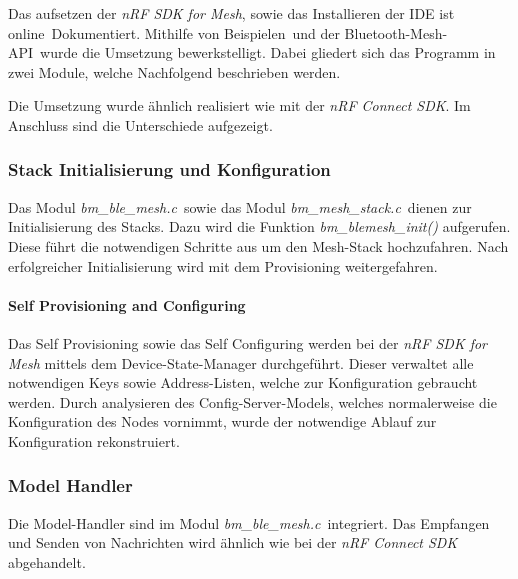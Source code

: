 Das aufsetzen der \textit{nRF SDK for Mesh}, sowie das Installieren der IDE ist online\footnotemark\ Dokumentiert. Mithilfe von Beispielen\footnotemark\ und der Bluetooth-Mesh-API\footnotemark\ wurde die Umsetzung bewerkstelligt. Dabei gliedert sich das Programm in zwei Module, welche Nachfolgend beschrieben werden.

Die Umsetzung wurde ähnlich realisiert wie mit der \textit{nRF Connect SDK}. Im Anschluss sind die Unterschiede aufgezeigt. 





\subsubsection{Stack Initialisierung und Konfiguration}\label{subsubsec:BluetoothMeshUmsetzungnRFSDKInitandConfig} 
Das Modul \textit{bm\_ble\_mesh.c}\footnotemark\ sowie das Modul \textit{bm\_mesh\_stack.c}\footnotemark\ dienen zur Initialisierung des Stacks. Dazu wird die Funktion \textit{bm\_blemesh\_init()} aufgerufen. Diese führt die notwendigen Schritte aus um den Mesh-Stack hochzufahren. Nach erfolgreicher Initialisierung wird mit dem Provisioning weitergefahren.




\paragraph{Self Provisioning and Configuring}
Das Self Provisioning sowie das Self Configuring werden bei der \textit{nRF SDK for Mesh} mittels dem Device-State-Manager durchgeführt. Dieser verwaltet alle notwendigen Keys sowie Address-Listen, welche zur Konfiguration gebraucht werden. Durch analysieren des Config-Server-Models, welches normalerweise die Konfiguration des Nodes vornimmt, wurde der notwendige Ablauf zur Konfiguration rekonstruiert. 

\subsubsection{Model Handler}\label{subsubsec:BluetoothMeshUmsetzungnRFSDKModelHandler}

Die Model-Handler sind im Modul \textit{bm\_ble\_mesh.c}\footnotemark\ integriert. Das Empfangen und Senden von Nachrichten wird ähnlich wie bei der \textit{nRF Connect SDK} abgehandelt. 
